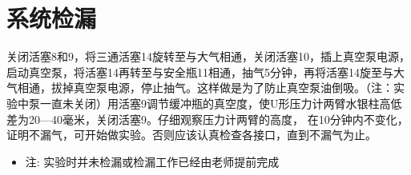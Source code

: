 \documentclass[11pt]{report}
\begin{document}
\section{系统检漏}
\label{sec:org528ce93}
关闭活塞8和9，将三通活塞14旋转至与大气相通，关闭活塞10，插上真空泵电源，启动真空泵，将活塞14再转至与安全瓶11相通，抽气5分钟，再将活塞14旋至与大气相通，拔掉真空泵电源，停止抽气。这样做是为了防止真空泵油倒吸。（注：实验中泵一直未关闭）用活塞9调节缓冲瓶的真空度，使U形压力计两臂水银柱高低差为20—40毫米，关闭活塞9。仔细观察压力计两臂的高度，
在10分钟内不变化，证明不漏气，可开始做实验。否则应该认真检查各接口，直到不漏气为止。

\begin{itemize}
\item 注: 实验时并未检漏或检漏工作已经由老师提前完成
\end{itemize}
\end{document}
